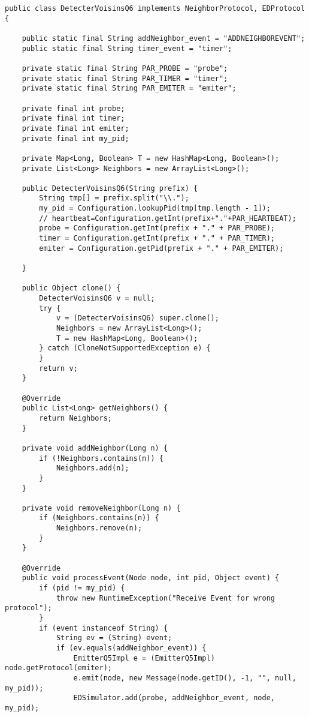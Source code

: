\documentclass[10pt]{report}
\begin{document}
\noindent\begin{minipage}{\textwidth}
\begin{shaded}
\begin{lstlisting}
public class DetecterVoisinsQ6 implements NeighborProtocol, EDProtocol {

	public static final String addNeighbor_event = "ADDNEIGHBOREVENT";
	public static final String timer_event = "timer";

	private static final String PAR_PROBE = "probe";
	private static final String PAR_TIMER = "timer";
	private static final String PAR_EMITER = "emiter";

	private final int probe;
	private final int timer;
	private final int emiter;
	private final int my_pid;

	private Map<Long, Boolean> T = new HashMap<Long, Boolean>();
	private List<Long> Neighbors = new ArrayList<Long>();

	public DetecterVoisinsQ6(String prefix) {
		String tmp[] = prefix.split("\\.");
		my_pid = Configuration.lookupPid(tmp[tmp.length - 1]);
		// heartbeat=Configuration.getInt(prefix+"."+PAR_HEARTBEAT);
		probe = Configuration.getInt(prefix + "." + PAR_PROBE);
		timer = Configuration.getInt(prefix + "." + PAR_TIMER);
		emiter = Configuration.getPid(prefix + "." + PAR_EMITER);

	}

	public Object clone() {
		DetecterVoisinsQ6 v = null;
		try {
			v = (DetecterVoisinsQ6) super.clone();
			Neighbors = new ArrayList<Long>();
			T = new HashMap<Long, Boolean>();
		} catch (CloneNotSupportedException e) {
		}
		return v;
	}

	@Override
	public List<Long> getNeighbors() {
		return Neighbors;
	}

	private void addNeighbor(Long n) {
		if (!Neighbors.contains(n)) {
			Neighbors.add(n);
		}
	}

	private void removeNeighbor(Long n) {
		if (Neighbors.contains(n)) {
			Neighbors.remove(n);
		}
	}

	@Override
	public void processEvent(Node node, int pid, Object event) {
		if (pid != my_pid) {
			throw new RuntimeException("Receive Event for wrong protocol");
		}
		if (event instanceof String) {
			String ev = (String) event;
			if (ev.equals(addNeighbor_event)) {
				EmitterQ5Impl e = (EmitterQ5Impl) node.getProtocol(emiter);
				e.emit(node, new Message(node.getID(), -1, "", null, my_pid));
				EDSimulator.add(probe, addNeighbor_event, node, my_pid);


\end{lstlisting}
\end{shaded}
\end{minipage}
\end{document}
